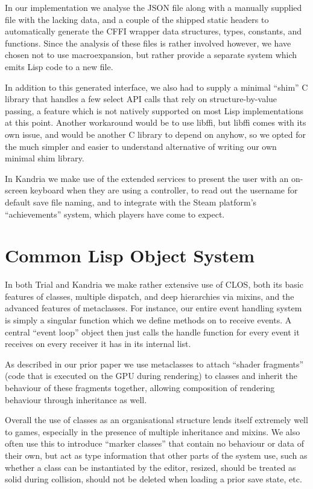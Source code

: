 \documentclass[format=sigconf]{acmart}
\begin{document}
In our implementation we analyse the JSON file along with a manually supplied file with the lacking data, and a couple of the shipped static headers to automatically generate the CFFI wrapper data structures, types, constants, and functions. Since the analysis of these files is rather involved however, we have chosen not to use macroexpansion, but rather provide a separate system which emits Lisp code to a new file.

In addition to this generated interface, we also had to supply a minimal ``shim'' C library that handles a few select API calls that rely on structure-by-value passing, a feature which is not natively supported on most Lisp implementations at this point. Another workaround would be to use libffi, but libffi comes with its own issue, and would be another C library to depend on anyhow, so we opted for the much simpler and easier to understand alternative of writing our own minimal shim library.

In Kandria we make use of the extended services to present the user with an on-screen keyboard when they are using a controller, to read out the username for default save file naming, and to integrate with the Steam platform's ``achievements'' system, which players have come to expect.

\section{Common Lisp Object System}\label{clos}
In both Trial and Kandria we make rather extensive use of CLOS, both its basic features of classes, multiple dispatch, and deep hierarchies via mixins, and the advanced features of metaclasses. For instance, our entire event handling system is simply a singular function  which we define methods on to receive events. A central ``event loop'' object then just calls the handle function for every event it receives on every receiver it has in its internal list.

As described in our prior paper \cite{hafner2018} we use metaclasses to attach ``shader fragments'' (code that is executed on the GPU during rendering) to classes and inherit the behaviour of these fragments together, allowing composition of rendering behaviour through inheritance as well.

Overall the use of classes as an organisational structure lends itself extremely well to games, especially in the presence of multiple inheritance and mixins. We also often use this to introduce ``marker classes'' that contain no behaviour or data of their own, but act as type information that other parts of the system use, such as whether a class can be instantiated by the editor, resized, should be treated as solid during collision, should not be deleted when loading a prior save state, etc.
\end{document}
